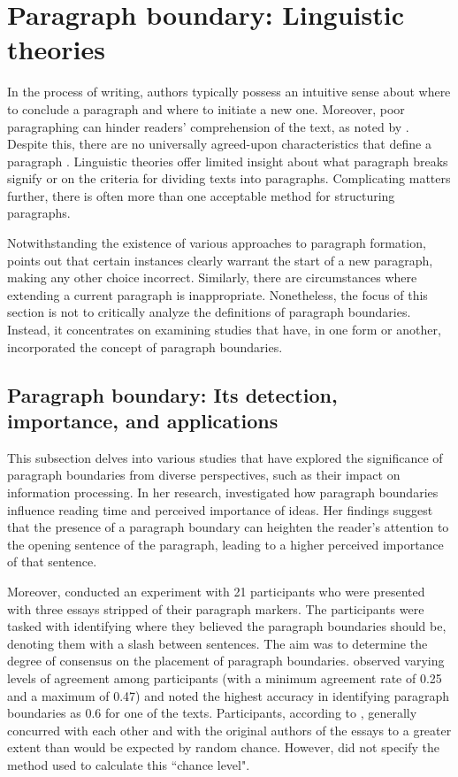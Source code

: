 \section{Paragraph boundary: Linguistic theories}\label{sec:litpar}

In the process of writing, authors typically possess an intuitive sense about where to conclude a paragraph and where to initiate a new one. Moreover, poor paragraphing can hinder readers' comprehension of the text, as noted by \citet{Hofmann1989}. Despite this, there are no universally agreed-upon characteristics that define a paragraph \citep{Hofmann1989, filippova-strube-2006-using}. Linguistic theories offer limited insight about what paragraph breaks signify or on the criteria for dividing texts into paragraphs. Complicating matters further, there is often more than one acceptable method for structuring paragraphs.

Notwithstanding the existence of various approaches to paragraph formation, \citet{Hofmann1989} points out that certain instances clearly warrant the start of a new paragraph, making any other choice incorrect. Similarly, there are circumstances where extending a current paragraph is inappropriate. Nonetheless, the focus of this section is not to critically analyze the definitions of paragraph boundaries. Instead, it concentrates on examining studies that have, in one form or another, incorporated the concept of paragraph boundaries.

\subsection{Paragraph boundary: Its detection, importance, and applications}\label{subsec:parboundimportance}

This subsection delves into various studies that have explored the significance of paragraph boundaries from diverse perspectives, such as their impact on information processing. In her research, \citet{Stark1988} investigated how paragraph boundaries influence reading time and perceived importance of ideas. Her findings suggest that the presence of a paragraph boundary can heighten the reader's attention to the opening sentence of the paragraph, leading to a higher perceived importance of that sentence.

Moreover, \citet{Stark1988} conducted an experiment with 21 participants who were presented with three essays stripped of their paragraph markers. The participants were tasked with identifying where they believed the paragraph boundaries should be, denoting them with a slash between sentences. The aim was to determine the degree of consensus on the placement of paragraph boundaries. \citet{Stark1988} observed varying levels of agreement among participants (with a minimum agreement rate of 0.25 and a maximum of 0.47) and noted the highest accuracy in identifying paragraph boundaries as 0.6 for one of the texts. Participants, according to \citeauthor{Stark1988}, generally concurred with each other and with the original authors of the essays to a greater extent than would be expected by random chance. However, \citeauthor{Stark1988} did not specify the method used to calculate this ``chance level".

